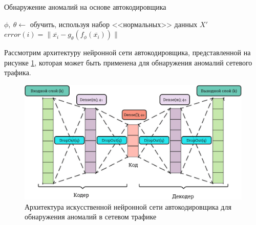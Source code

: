 \begin{algorithm}[htp!]
    \caption{Обнаружение аномалий на основе автокодировщика} \label{alg:AE_detector}
    \SetAlgoLined %
    
    $\phi,\ \theta \leftarrow$ обучить, используя набор <<нормальных>> данных $X'$ \\
     {
        $error(i) = \lVert \overline{x_i} - g_{\theta}(f_{\phi}(\overline{x_i})) \rVert$ \\
    }
\end{algorithm}

Рассмотрим архитектуру нейронной сети автокодировщика, представленной на рисунке \ref{fig:autoencoder-scheme}, которая может быть применена для обнаружения аномалий сетевого трафика.

\begin{figure}
  \centering
  \includegraphics[scale=0.23]{inc/images/autoencoder-scheme.png}
  \caption{Архитектура искусственной нейронной сети автокодировщика для обнаружения аномалий в сетевом трафике}
  \label{fig:autoencoder-scheme}
\end{figure}

